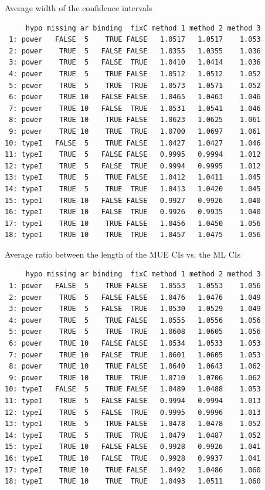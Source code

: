 \documentclass[12pt]{article}
\begin{document}
Average width of the confidence intervals
\begin{verbatim}
     hypo missing ar binding  fixC method 1 method 2 method 3
 1: power   FALSE  5    TRUE FALSE   1.0517   1.0517    1.053
 2: power    TRUE  5   FALSE FALSE   1.0355   1.0355    1.036
 3: power    TRUE  5   FALSE  TRUE   1.0410   1.0414    1.036
 4: power    TRUE  5    TRUE FALSE   1.0512   1.0512    1.052
 5: power    TRUE  5    TRUE  TRUE   1.0573   1.0571    1.052
 6: power    TRUE 10   FALSE FALSE   1.0465   1.0463    1.046
 7: power    TRUE 10   FALSE  TRUE   1.0531   1.0541    1.046
 8: power    TRUE 10    TRUE FALSE   1.0623   1.0625    1.061
 9: power    TRUE 10    TRUE  TRUE   1.0700   1.0697    1.061
10: typeI   FALSE  5    TRUE FALSE   1.0427   1.0427    1.046
11: typeI    TRUE  5   FALSE FALSE   0.9995   0.9994    1.012
12: typeI    TRUE  5   FALSE  TRUE   0.9994   0.9995    1.012
13: typeI    TRUE  5    TRUE FALSE   1.0412   1.0411    1.045
14: typeI    TRUE  5    TRUE  TRUE   1.0413   1.0420    1.045
15: typeI    TRUE 10   FALSE FALSE   0.9927   0.9926    1.040
16: typeI    TRUE 10   FALSE  TRUE   0.9926   0.9935    1.040
17: typeI    TRUE 10    TRUE FALSE   1.0456   1.0450    1.056
18: typeI    TRUE 10    TRUE  TRUE   1.0457   1.0475    1.056
\end{verbatim}

Average ratio between the length of the MUE CIs vs. the ML CIs
\begin{verbatim}
     hypo missing ar binding  fixC method 1 method 2 method 3
 1: power   FALSE  5    TRUE FALSE   1.0553   1.0553    1.056
 2: power    TRUE  5   FALSE FALSE   1.0476   1.0476    1.049
 3: power    TRUE  5   FALSE  TRUE   1.0530   1.0529    1.049
 4: power    TRUE  5    TRUE FALSE   1.0555   1.0556    1.056
 5: power    TRUE  5    TRUE  TRUE   1.0608   1.0605    1.056
 6: power    TRUE 10   FALSE FALSE   1.0534   1.0533    1.053
 7: power    TRUE 10   FALSE  TRUE   1.0601   1.0605    1.053
 8: power    TRUE 10    TRUE FALSE   1.0640   1.0643    1.062
 9: power    TRUE 10    TRUE  TRUE   1.0710   1.0706    1.062
10: typeI   FALSE  5    TRUE FALSE   1.0489   1.0488    1.053
11: typeI    TRUE  5   FALSE FALSE   0.9994   0.9994    1.013
12: typeI    TRUE  5   FALSE  TRUE   0.9995   0.9996    1.013
13: typeI    TRUE  5    TRUE FALSE   1.0478   1.0478    1.052
14: typeI    TRUE  5    TRUE  TRUE   1.0479   1.0487    1.052
15: typeI    TRUE 10   FALSE FALSE   0.9928   0.9926    1.041
16: typeI    TRUE 10   FALSE  TRUE   0.9928   0.9937    1.041
17: typeI    TRUE 10    TRUE FALSE   1.0492   1.0486    1.060
18: typeI    TRUE 10    TRUE  TRUE   1.0493   1.0511    1.060
\end{verbatim}
\end{document}
